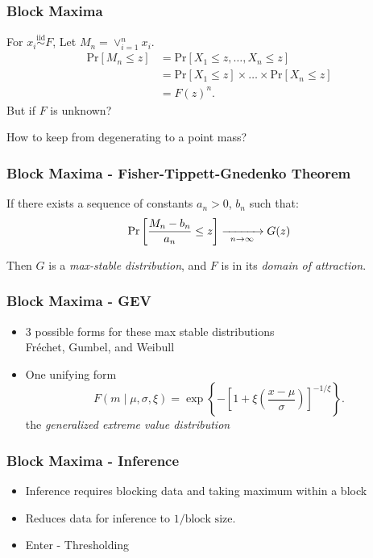 \documentclass[aspectratio=169]{beamer}
\begin{document}
\begin{frame}
  \frametitle{Block Maxima}
  For $x_i \stackrel{\text{iid}}{\sim} F$, Let $M_n = \vee_{i=1}^n x_i$.
  \begin{equation*}
    \begin{aligned}
      \text{Pr}\left[M_n\leq z\right] &= \text{Pr}\left[X_1 \leq z, \ldots, X_n \leq z\right]\\
        &= \text{Pr}\left[X_1\leq z\right]\times\ldots\times\text{Pr}\left[X_n\leq z\right]\\
        &= F(z)^n.
    \end{aligned}
  \end{equation*}
  But if $F$ is unknown?

  How to keep from degenerating to a point mass?
\end{frame} %
\begin{frame}
  \frametitle{Block Maxima - Fisher-Tippett-Gnedenko Theorem}
  If there exists a sequence of constants $a_n > 0$, $b_n$ such that:
  \begin{equation*}
    \text{Pr}\left[\frac{M_n - b_n}{a_n} \leq z\right] \xrightarrow[\enskip n\to\infty\enskip]{} G(z)
  \end{equation*}

  Then $G$ is a \emph{max-stable distribution}, and $F$ is in its \emph{domain of attraction}.
\end{frame} %
\begin{frame}
  \frametitle{Block Maxima - GEV}
  \begin{itemize}
    \item 3 possible forms for these max stable distributions\\
      \hspace{1cm}Fr{\'e}chet, Gumbel, and Weibull
    \pause
    \item One unifying form
      \begin{equation*}
        F(m \mid \mu, \sigma, \xi) = \exp\left\lbrace-\left[1 +
              \xi\left(\frac{x - \mu}{\sigma}\right)\right]_{}^{-1/{\xi}}\right\rbrace.
      \end{equation*}
      the \emph{generalized extreme value distribution}
  \end{itemize}
\end{frame} %
\begin{frame}
  \frametitle{Block Maxima - Inference}
  \begin{itemize}
    \item Inference requires blocking data and taking maximum within a block
    \item Reduces data for inference to $1 / \text{block size}$.
    \item Enter - Thresholding
  \end{itemize}
\end{frame} %
\end{document}
